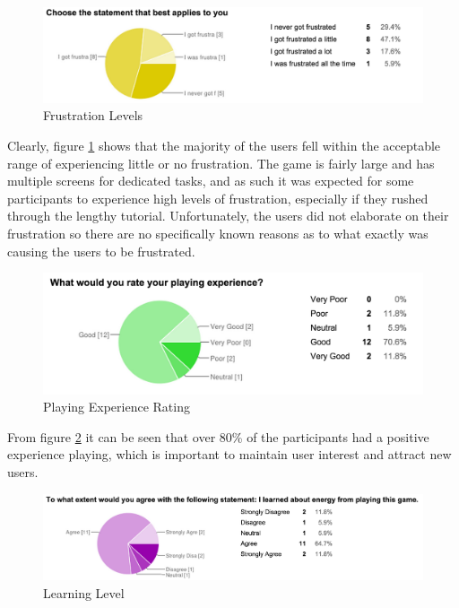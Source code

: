 \documentclass[msc,oneside]{ubcthesis}%
\begin{document}
\begin{figure}[hbt]
  \begin{center}
    \includegraphics[width=1\textwidth]{survey_pics/numeric/frusterated}
    \caption[Frustration Levels]{Frustration Levels}\label{frusterated}
  \end{center}
\end{figure}

Clearly, figure \ref{frusterated} shows that the majority of the users fell within the acceptable range of experiencing little or no frustration. The game is fairly large and has multiple screens for dedicated tasks, and as such it was expected for some participants to experience high levels of frustration, especially if they rushed through the lengthy tutorial. Unfortunately, the users did not elaborate on their frustration so there are no specifically known reasons as to what exactly was causing the users to be frustrated.

\newpage

\begin{figure}[hbt]
  \begin{center}
    \includegraphics[width=1\textwidth]{survey_pics/numeric/playing_experience}
    \caption[Playing experience rating]{Playing Experience Rating}\label{playingExperience}
  \end{center}
\end{figure}

From figure \ref{playingExperience} it can be seen that over 80\% of the participants had a positive experience playing, which is important to maintain user interest and attract new users.

\begin{figure}[hbt]
  \begin{center}
    \includegraphics[width=1\textwidth]{survey_pics/numeric/learning}
    \caption[Learning level ]{Learning Level}\label{learning}
  \end{center}
\end{figure}
\end{document}

